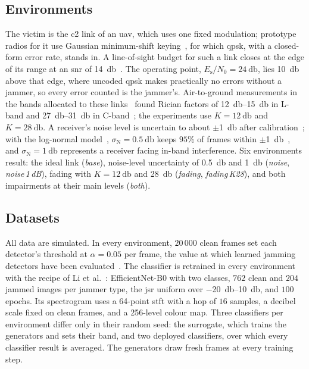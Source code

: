 \subsection{Environments} \label{sec:expsetup:env}
The victim is the \ac{c2} link of an \ac{uav}, which uses one fixed modulation; prototype radios for it use Gaussian minimum-shift keying~\cite{bishop2017cnpc}, for which \ac{qpsk}, with a closed-form error rate, stands in.
A line-of-sight budget for such a link closes at the edge of its range at an \ac{snr} of \SI{14}{\decibel}~\cite{kakar2015uav}.
The operating point, $E_\text{s}/N_0=\SI{24}{\decibel}$, lies \SI{10}{\decibel} above that edge, where uncoded \ac{qpsk} makes practically no errors without a jammer, so every error counted is the jammer's.
Air-to-ground measurements in the bands allocated to these links~\cite{kerczewski2015cosite} found Rician factors of \SIrange{12}{15}{\decibel} in L-band and \SIrange{27}{31}{\decibel} in C-band~\cite{matolak2017airground1,sun2017airground2,matolak2017airground3,khawaja2019survey}; the experiments use $K=\SI{12}{\decibel}$ and $K=\SI{28}{\decibel}$.
A receiver's noise level is uncertain to about $\pm$\SI{1}{\decibel} after calibration~\cite{shellhammer2006noise,tandra2008snr}; with the log-normal model~\cite{sonnenschein1992radiometric,he2017covert}, $\sigma_\text{N}=\SI{0.5}{\decibel}$ keeps $95\%$ of frames within $\pm$\SI{1}{\decibel}~\cite{nikonowicz2019noise}, and $\sigma_\text{N}=\SI{1}{\decibel}$ represents a receiver facing in-band interference.
Six environments result: the ideal link (\emph{base}), noise-level uncertainty of \SI{0.5}{\decibel} and \SI{1}{\decibel} (\emph{noise}, \emph{noise\,1\,dB}), fading with $K=\SI{12}{\decibel}$ and \SI{28}{\decibel} (\emph{fading}, \emph{fading\,K28}), and both impairments at their main levels (\emph{both}).

\subsection{Datasets} \label{sec:expsetup:data}
All data are simulated.
In every environment, $20\,000$ clean frames set each detector's threshold at $\alpha=0.05$ per frame, the value at which learned jamming detectors have been evaluated~\cite{arcangeloni2024jamming}.
The classifier is retrained in every environment with the recipe of Li et al.~\cite{li2022jamming_ofdm}: EfficientNet-B0 with two classes, $762$ clean and $204$ jammed images per jammer type, the \ac{jsr} uniform over \SIrange{-20}{10}{\decibel}, and $100$ epochs.
Its spectrogram uses a 64-point \ac{stft} with a hop of $16$ samples, a decibel scale fixed on clean frames, and a 256-level colour map.
Three classifiers per environment differ only in their random seed: the surrogate, which trains the generators and sets their band, and two deployed classifiers, over which every classifier result is averaged.
The generators draw fresh frames at every training step.

